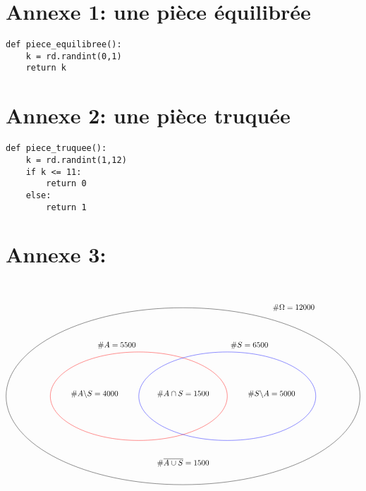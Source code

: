 \documentclass[a4paper,11pt]{article}
\theoremstyle{definition}
\begin{document}
\newpage

		\section*{Annexe 1: une pièce équilibrée}
\begin{lstlisting}[style=stylepython]
def piece_equilibree():
	k = rd.randint(0,1)	
	return k			
\end{lstlisting}

\section*{Annexe 2: une pièce truquée}
\begin{lstlisting}[style=stylepython]
def piece_truquee():
	k = rd.randint(1,12)
	if k <= 11:
		return 0
	else:
		return 1			
\end{lstlisting}


\section*{Annexe 3:}
\hfil\\[1cm]

$$\begin{tikzpicture}[scale=2]
\draw[red](-1,0) ellipse [x radius=2cm, y radius=1cm];
\draw(2,0.05) node{$\#S\backslash A = 5000 $};
\draw(-2,0.05) node{$\#A\backslash S = 4000$};
\draw(0,-1.5) node[]{$\#\overline{A\cup S} = 1500$};
\draw(0,0.05) node{$\#A\cap S = 1500$};
\draw(2.5,2) node{$\#\Omega = 12000$};
\draw(-1.5,1.15) node{$\#A = 5500$};
\draw(1.5,1.15) node{$\#S = 6500$};
\draw[blue](1,0) ellipse [x radius=2cm, y radius=1cm];
\draw[black](0,0) ellipse [x radius=4cm, y radius=2cm];
\end{tikzpicture}$$
\end{document}
